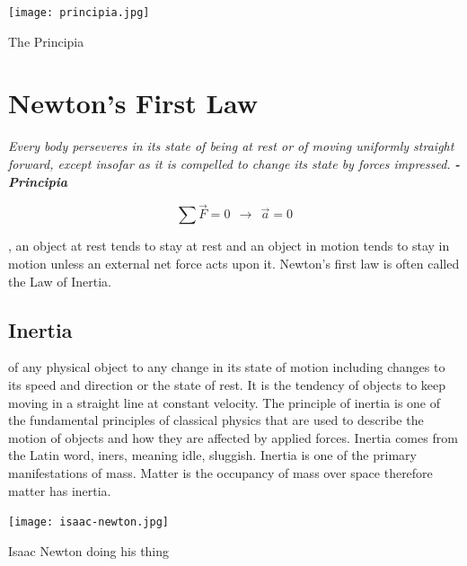 \begin{marginfigure}[30pt]%
  \texttt{[image: principia.jpg]}
  \caption{The Principia}
  \label{fig:marginfig}
\end{marginfigure}


\section{Newton's First Law}


\textit{Every body perseveres in its state of being at rest or of moving uniformly straight forward, except insofar as it is compelled to change its state by forces impressed.} \textbf{\textit{- Principia}}


$$\sum \overrightarrow{F}=0\ \ \longrightarrow \ \ \overrightarrow{a}=0$$

, an object at rest tends to stay at rest and an object in motion tends to stay in motion unless an external net force acts upon it.  Newton's first law is often called the Law of Inertia.

\newpage

\subsection{Inertia}
 of any physical object to any change in its state of motion including changes to its speed and direction or the state of rest. It is the tendency of objects to keep moving in a straight line at constant velocity. The principle of inertia is one of the fundamental principles of classical physics that are used to describe the motion of objects and how they are affected by applied forces. Inertia comes from the Latin word, iners, meaning idle, sluggish. Inertia is one of the primary manifestations of mass.  Matter is the occupancy of mass over space therefore matter has inertia.
 


\begin{marginfigure}[110pt]%
  \texttt{[image: isaac-newton.jpg]}
  \caption{Isaac Newton doing his thing}
  \label{fig:marginfig}
\end{marginfigure}
 
